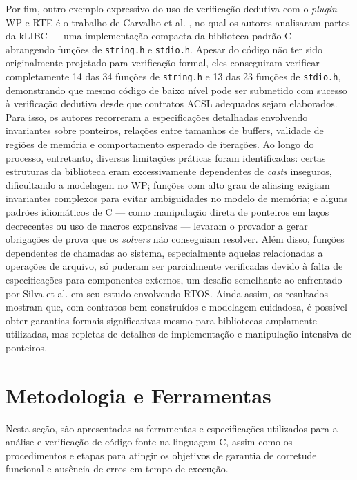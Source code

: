 \documentclass{article}
\begin{document}
Por fim, outro exemplo expressivo do uso de verificação dedutiva com o \emph{plugin} WP e RTE é o trabalho de Carvalho et al. \cite{carvalho2014klibc}, no qual os autores analisaram partes da kLIBC — uma
implementação compacta da biblioteca padrão C — abrangendo funções de \texttt{string.h} e \texttt{stdio.h}. Apesar do código não ter sido originalmente projetado para verificação formal, eles
conseguiram verificar completamente 14 das 34 funções de \texttt{string.h} e 13 das 23 funções de \texttt{stdio.h}, demonstrando que mesmo código de baixo nível pode ser submetido com sucesso à
verificação dedutiva desde que contratos ACSL adequados sejam elaborados. Para isso, os autores recorreram a especificações detalhadas envolvendo invariantes sobre ponteiros, relações entre tamanhos
de buffers, validade de regiões de memória e comportamento esperado de iterações. Ao longo do processo, entretanto, diversas limitações práticas foram identificadas: certas estruturas da biblioteca eram
excessivamente dependentes de \emph{casts} inseguros, dificultando a modelagem no WP; funções com alto grau de aliasing exigiam invariantes complexos para evitar ambiguidades no modelo de memória; e
alguns padrões idiomáticos de C — como manipulação direta de ponteiros em laços decrecentes ou uso de macros expansivas — levaram o provador a gerar obrigações de prova que os \emph{solvers} não
conseguiam resolver. Além disso, funções dependentes de chamadas ao sistema, especialmente aquelas relacionadas a operações de arquivo, só puderam ser parcialmente verificadas devido à falta de
especificações para componentes externos, um desafio semelhante ao enfrentado por Silva et al. \cite{silva2016formal} em seu estudo envolvendo RTOS. Ainda assim, os resultados mostram que, com
contratos bem construídos e modelagem cuidadosa, é possível obter garantias formais significativas mesmo para bibliotecas amplamente utilizadas, mas repletas de detalhes de implementação e manipulação
intensiva de ponteiros.

   
\clearpage
\section{Metodologia e Ferramentas}\label{chap:metodologia}

Nesta seção, são apresentadas as ferramentas e especificações utilizados para a análise e verificação de código fonte na linguagem C, assim como os procedimentos e etapas para atingir os objetivos de garantia de corretude funcional e ausência de erros em tempo de execução.
\end{document}
